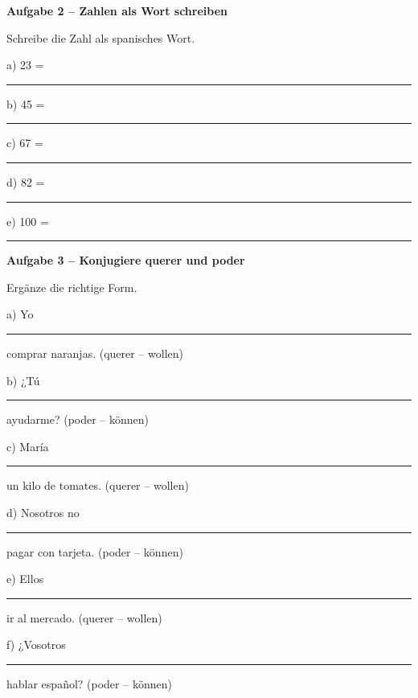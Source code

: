 \documentclass[11pt, a4paper]{article}
\newcommand{\fachfarbe}{spanisch}
\newcommand{\punktebox}[1]{\hfill\fbox{\small \_/#1}}
\newcommand{\luecke}[1]{\rule{#1}{0.4pt}}
\newenvironment{aufgabe}[1]{%
    \needspace{5\baselineskip}%
    \nopagebreak[4]%
    \vspace{10pt}
    \noindent\textbf{\textcolor{\fachfarbe}{Aufgabe #1}}
    \nopagebreak[4]%
    \vspace{5pt}
    \nopagebreak[4]%
    \begin{list}{}{\leftmargin=0pt}
    \item[]
}{%
    \end{list}
}
\newcommand{\es}[1]{\textcolor{\fachfarbe}{\textbf{#1}}}
\begin{document}
\begin{aufgabe}{2 -- Zahlen als Wort schreiben}
Schreibe die Zahl als spanisches Wort. \punktebox{5}
\end{aufgabe}

\noindent
a) 23 = \luecke{5cm}

\vspace{0.8em}

\noindent
b) 45 = \luecke{5cm}

\vspace{0.8em}

\noindent
c) 67 = \luecke{5cm}

\vspace{0.8em}

\noindent
d) 82 = \luecke{5cm}

\vspace{0.8em}

\noindent
e) 100 = \luecke{5cm}

\vspace{15pt}


\begin{aufgabe}{3 -- Konjugiere \es{querer} und \es{poder}}
Ergänze die richtige Form. \punktebox{6}
\end{aufgabe}

\noindent
a) Yo \luecke{2.5cm} comprar naranjas. \hfill (querer -- wollen)

\vspace{0.8em}

\noindent
b) ¿Tú \luecke{2.5cm} ayudarme? \hfill (poder -- können)

\vspace{0.8em}

\noindent
c) María \luecke{2.5cm} un kilo de tomates. \hfill (querer -- wollen)

\vspace{0.8em}

\noindent
d) Nosotros no \luecke{2.5cm} pagar con tarjeta. \hfill (poder -- können)

\vspace{0.8em}

\noindent
e) Ellos \luecke{2.5cm} ir al mercado. \hfill (querer -- wollen)

\vspace{0.8em}

\noindent
f) ¿Vosotros \luecke{2.5cm} hablar español? \hfill (poder -- können)
\end{document}
